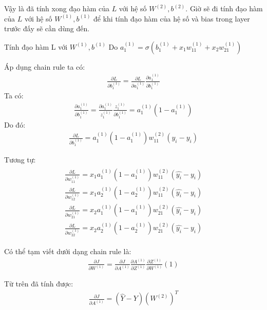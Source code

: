 Vậy là đã tính xong đạo hàm của $L$ với hệ số $W^{(2)}, b^{(2)}$. Giờ sẽ đi tính đạo hàm của $L$ với hệ số $W^{(1)}, b^{(1)}$ để khi tính đạo hàm của hệ số và bias trong layer trước đấy sẽ cần dùng đến.

Tính đạo hàm L với $W^{(1)}, b^{(1)}$
Do $ a_1^{(1)} = \sigma(b_1^{(1)} + x_1 w_{11}^{(1)} + x_2 w_{21}^{(1)})$ 

Áp dụng chain rule ta có: 
\begin{align}
\frac{\partial L}{\partial b_1^{(1)}} = \frac{\partial L}{\partial a_1^{(1)}}  \frac{\partial a_1^{(1)}}{\partial b_1^{(1)} }
\end{align}
Ta có:
\begin{align}
\frac{\partial a_1^{(1)}}{\partial b_1^{(1)}} = \frac{\partial a_1^{(1)}}{z_1^{(1)}}  \frac{z_1^{(1)}}{\partial b_1^{(1)}} = a_1^{(1)}  (1 - a_1^{(1)})
\end{align}
Do đó:
\begin{align}
\frac{\partial L}{\partial b_1^{(1)}} = a_1 ^ {(1)}  (1 - a_1^{(1)})  w_{11}^{(2)}  (\hat{y_i} - y_i)
\end{align}

Tương tự:
\begin{align}
\begin{split}
\frac{\partial L}{\partial w_{11}^{(1)}} = x_1  a_1 ^ {(1)}  (1 - a_1^{(1)})  w_{11}^{(2)}   (\hat{y_i} - y_i)  \\
\frac{\partial L}{\partial w_{12}^{(1)}} = x_1  a_2 ^ {(1)}  (1 - a_2^{(1)})  w_{11}^{(2)}   (\hat{y_i} - y_i)  \\
\frac{\partial L}{\partial w_{21}^{(1)}} = x_2  a_1 ^ {(1)}  (1 - a_1^{(1)})  w_{21}^{(2)}   (\hat{y_i} - y_i)  \\
\frac{\partial L}{\partial w_{22}^{(1)}} = x_2  a_2^ {(1)}  (1 - a_2^{(1)})  w_{21}^{(2)}   (\hat{y_i} - y_i)
\end{split}
\end{align}

Có thể tạm viết dưới dạng chain rule là: 
\begin{align}
\frac{\partial J}{\partial W^{(1)}} = \frac{\partial J}{\partial A^{(1)}}  \frac{\partial A^{(1)}}{\partial Z^{(1)}} \frac{\partial Z^{(1)}}{\partial W^{(1)}} (1) 
\end{align}

Từ trên đã tính được: 
\begin{align}
\frac{\partial J}{\partial A^{(1)}} = (\hat{Y} - Y)  (W^{(2)})^T
\end{align}

